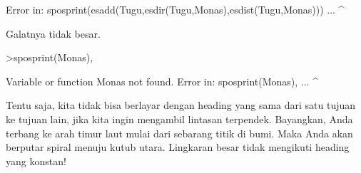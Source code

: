 \documentclass[a4paper,10pt]{article}
\begin{document}
\begin{eulernotebook}
\begin{eulercomment}
\begin{eulercomment}
\begin{eulercomment}
\begin{eulercomment}
\begin{eulercomment}
\begin{eulercomment}
\begin{eulercomment}
\begin{eulercomment}
\begin{eulercomment}
\begin{eulercomment}
\begin{eulercomment}
\begin{eulercomment}
\begin{eulercomment}
\begin{eulercomment}
\begin{eulercomment}
\begin{eulercomment}
\begin{eulercomment}
\begin{eulercomment}
\begin{euleroutput}
  Error in:
  sposprint(esadd(Tugu,esdir(Tugu,Monas),esdist(Tugu,Monas))) ...
                      ^
\end{euleroutput}
\begin{eulercomment}
Galatnya tidak besar.
\end{eulercomment}
\begin{eulerprompt}
>sposprint(Monas),
\end{eulerprompt}
\begin{euleroutput}
  Variable or function Monas not found.
  Error in:
  sposprint(Monas), ...
                 ^
\end{euleroutput}
\begin{eulercomment}
Tentu saja, kita tidak bisa berlayar dengan heading yang sama dari satu tujuan ke tujuan lain,
jika kita ingin mengambil lintasan terpendek. Bayangkan, Anda terbang ke arah timur laut
mulai dari sebarang titik di bumi. Maka Anda akan berputar spiral menuju kutub utara.
Lingkaran besar tidak mengikuti heading yang konstan!


\end{eulercomment}
\end{eulercomment}
\end{eulercomment}
\end{eulercomment}
\end{eulercomment}
\end{eulercomment}
\end{eulercomment}
\end{eulercomment}
\end{eulercomment}
\end{eulercomment}
\end{eulercomment}
\end{eulercomment}
\end{eulercomment}
\end{eulercomment}
\end{eulercomment}
\end{eulercomment}
\end{eulercomment}
\end{eulercomment}
\end{eulercomment}
\end{eulernotebook}
\end{document}
